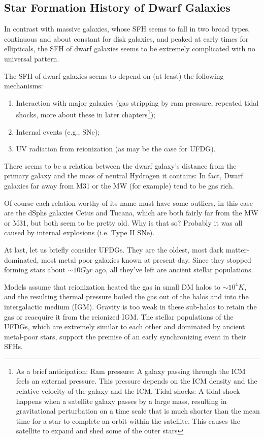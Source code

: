 \subsection{Star Formation History of Dwarf Galaxies}

In contrast with massive galaxies, whose SFH seems to fall in two broad types, continuous and about constant for disk galaxies, and peaked at early times for ellipticals, the SFH of dwarf galaxies seems to be extremely complicated with no universal pattern.
\par The SFH of dwarf galaxies seems to depend on (at least) the following mechanisms:
\begin{enumerate}
    \item  Interaction with major galaxies (gas stripping by ram pressure, repeated tidal shocks, more about these in later chapters\footnote{As a brief anticipation: Ram pressure: A galaxy passing through the ICM feels an external pressure. This pressure depends on the ICM density and the relative velocity of the galaxy and the ICM. Tidal shocks: A tidal shock happens when a satellite galaxy passes by a large mass, resulting in gravitational perturbation on a time scale that is much shorter than the mean time for a star to complete an orbit within the satellite. This causes the satellite to expand and shed some of the outer stars});
    \item Internal events (e.g., SNe);
    \item UV radiation from reionization (as may be the case for UFDG).
\end{enumerate}
There seems to be a relation between the dwarf galaxy's distance from the primary galaxy and the mass of neutral Hydrogen it contains: In fact, Dwarf galaxies far away from M31 or the MW (for example) tend to be gas rich.
\par Of course each relation worthy of its name must have some outliers, in this case are the dSphs galaxies Cetus and Tucana, which are both fairly far from the MW or M31, but both seem to be pretty old. Why is that so? Probably it was all caused by internal explosions (i.e. Type II SNe).
\par At last, let us briefly consider UFDGs. They are the oldest, most dark matter-dominated, most metal poor galaxies known at present day. Since they stopped forming stars about $\sim 10\unit{Gyr}$ ago, all they've left are ancient stellar populations.
\par Models assume that reionization heated the gas in small DM halos to $\sim 10^{4}\unit{K}$, and the resulting thermal pressure boiled the gas out of the halos and into the intergalactic medium (IGM). Gravity is too weak in these sub-halos to retain the gas or reacquire it from the reionized IGM. The stellar populations of the UFDGs, which are extremely similar to each other and dominated by ancient metal-poor stars, support the premise of an early synchronizing event in their SFHs.
